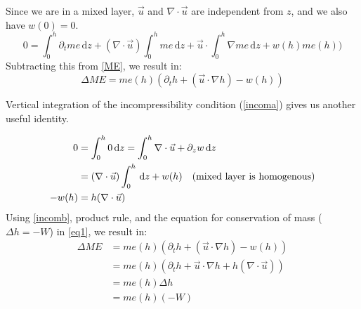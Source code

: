 \documentclass[10pt]{article}
\newcommand{\rmd}{\,\mathrm{d}}
\begin{document}
 Since we are in a mixed layer, $\vec{u}$ and $\nabla \cdot \vec{u}$ are independent from $z$, and we also have $w(0)=0$. 
 \begin{equation*}
 0 = \int_{0}^{h} \partial_t me \rmd z +  (\nabla \cdot \vec{u})\int_{0}^{h}  me \rmd z + \vec{u} \cdot \int_{0}^{h} \nabla me \rmd z +w(h)me(h))
 \end{equation*}
Subtracting this from \ref{ME}, we result in:
\begin{equation}
\Delta ME = me(h)\left(\partial_t h + (\vec{u}\cdot \nabla h )  - w(h)\right)
\label{eq1}
\end{equation}

Vertical integration of the incompressibility condition (\ref{incoma}) gives us another useful identity.

\begin{align}
0 &= \int_{0}^{h} 0 \rmd z =  \int_{0}^{h} \nabla \cdot \vec{u} + \partial_z w \rmd z \\
&= (\nabla \cdot \vec{u}) \int_{0}^{h} \rmd z + w(h)\text{\quad (mixed layer is homogenous)}\\
-w(h) &= h(\nabla \cdot \vec{u}) \label{incomb}
\end{align}
Using  \ref{incomb}, product rule, and the equation for conservation of mass ($\Delta h = -W$) in \ref{eq1},  we result in: 
\begin{align}
\Delta ME &= me(h)\left(\partial_t h + (\vec{u}\cdot \nabla h )  - w(h)\right) \\
&= me(h)\left(\partial_t h + \vec{u} \cdot \nabla h + h(\nabla \cdot \vec{u})\right) \\
&= me(h) \Delta h \\
&= me(h) (-W)
\label{eq2}
\end{align}
\end{document}
